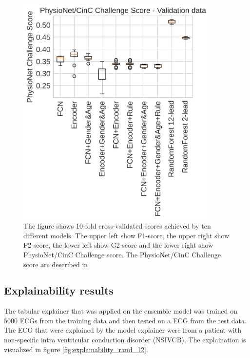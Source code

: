 \begin{figure}[hb!]
{\begin{minipage}[c][1\width]{
	   0.5\textwidth}
	   \includegraphics[width=0.9\textwidth]{Figures/PhysioNetChallenge_score_val}
	   \vspace{0em}
	\end{minipage}}
    \caption{The figure shows 10-fold cross-validated scores achieved by ten different models. The upper left show F1-score, the upper right show F2-score, the lower left show G2-score and the lower right show PhysioNet/CinC Challenge score. The PhysioNet/CinC Challenge score are described in \cite{alday_classification_2020}}
\label{fig:crossval_score}
\end{figure}



\subsection{Explainability results}
The tabular explainer that was applied on the ensemble model was trained on $5000$ ECGs from the training data and then tested on a ECG from the test data. The ECG that were explained by the model explainer were from a patient with non-specific intra ventricular conduction disorder (NSIVCB). The explaination is visualized in figure \ref{fig:explainability_rand_12}.

